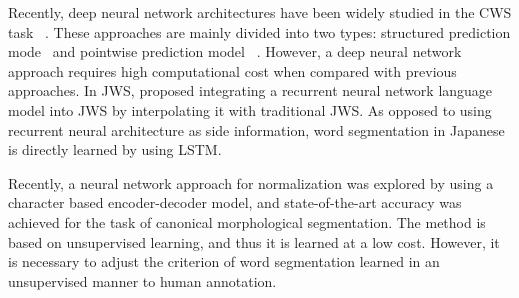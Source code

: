 \documentclass[11pt,letterpaper]{article}
\begin{document}

Recently, deep neural network architectures have been widely studied in the CWS task ~\cite{chen-EtAl:2015:EMNLP2,chen-EtAl:2015:ACL-IJCNLP5,pei-ge-chang:2014:P14-1,zhang-zhang-fu:2016:P16-1,cai-zhao:2016:P16-1}. These approaches are mainly divided into two types: structured prediction mode~\cite{zhang-zhang-fu:2016:P16-1,cai-zhao:2016:P16-1} and pointwise prediction model ~\cite{chen-EtAl:2015:EMNLP2,chen-EtAl:2015:ACL-IJCNLP5,pei-ge-chang:2014:P14-1}. However, a deep neural network approach requires high computational cost when compared with previous approaches. 
In JWS,  proposed integrating a recurrent neural network language model into JWS by interpolating it with traditional JWS. As opposed to using recurrent neural architecture as side information, word segmentation in Japanese is directly learned by using LSTM. 


Recently, a neural network approach for normalization was explored \cite{kann-cotterell-schutze:2016:EMNLP2016, ikeda2016norm}  by using a character based encoder-decoder model, and state-of-the-art accuracy was achieved for the task of canonical
morphological segmentation.
The method is based on unsupervised learning, and thus it is learned at a low cost. However, it is necessary to adjust the criterion of word segmentation learned in an unsupervised manner to human annotation.




 
\end{document}
